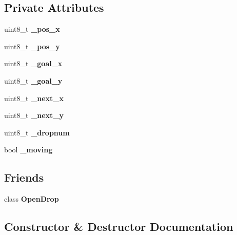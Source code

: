 \subsection*{Private Attributes}
\begin{DoxyCompactItemize}
\item 
\mbox{\label{class_drop_a719d170309d5c3f96c4bffa092047ef4}} 
uint8\+\_\+t {\bfseries \+\_\+pos\+\_\+x}
\item 
\mbox{\label{class_drop_a103e8cd8958e0152327afdc29a4e8123}} 
uint8\+\_\+t {\bfseries \+\_\+pos\+\_\+y}
\item 
\mbox{\label{class_drop_abb30a932ed5959c55745c9dd94c882b1}} 
uint8\+\_\+t {\bfseries \+\_\+goal\+\_\+x}
\item 
\mbox{\label{class_drop_aa9aa7a2ac7a94b346b79bcc1cfb6b49a}} 
uint8\+\_\+t {\bfseries \+\_\+goal\+\_\+y}
\item 
\mbox{\label{class_drop_a78325542b1ed8a803372646997f9a60f}} 
uint8\+\_\+t {\bfseries \+\_\+next\+\_\+x}
\item 
\mbox{\label{class_drop_a9eda189b9c2f611bf6bc1ebac1fadd97}} 
uint8\+\_\+t {\bfseries \+\_\+next\+\_\+y}
\item 
\mbox{\label{class_drop_a793f874ac91481334fdad21c6a86eaee}} 
uint8\+\_\+t {\bfseries \+\_\+dropnum}
\item 
\mbox{\label{class_drop_a95355bb49ca61a05f601d01fdb8cf5ec}} 
bool {\bfseries \+\_\+moving}
\end{DoxyCompactItemize}
\subsection*{Friends}
\begin{DoxyCompactItemize}
\item 
\mbox{\label{class_drop_a26dedab9dae27f9407568a75536f56bd}} 
class {\bfseries Open\+Drop}
\end{DoxyCompactItemize}


\subsection{Constructor \& Destructor Documentation}
\mbox{\label{class_drop_a4f50edd210be7bcbea7ae60c36b00a47}} 
